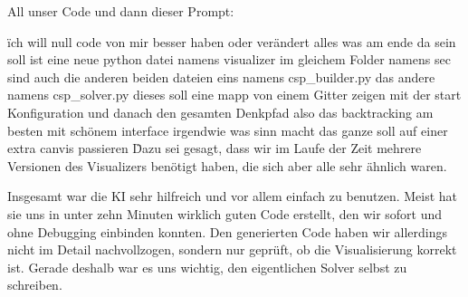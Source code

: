 \documentclass{article}
\begin{document}
All unser Code und dann dieser Prompt:

\"
ich will null code von mir besser haben oder verändert
alles was am ende da sein soll ist eine neue python datei namens visualizer
im gleichem Folder namens sec sind auch die anderen beiden dateien
eins namens csp\_builder.py das andere namens csp\_solver.py
dieses soll eine mapp von einem Gitter zeigen mit der start Konfiguration und danach den gesamten Denkpfad also das backtracking am besten mit schönem interface irgendwie was sinn macht
das ganze soll auf einer extra canvis passieren
\"

Dazu sei gesagt, dass wir im Laufe der Zeit mehrere Versionen des Visualizers benötigt haben, die sich aber alle sehr ähnlich waren.

Insgesamt war die KI sehr hilfreich und vor allem einfach zu benutzen. Meist hat sie uns in unter zehn Minuten 
wirklich guten Code erstellt, den wir sofort und ohne Debugging einbinden konnten. 
Den generierten Code haben wir allerdings nicht im Detail nachvollzogen, sondern nur 
geprüft, ob die Visualisierung korrekt ist. Gerade deshalb war es uns wichtig, den eigentlichen Solver selbst zu schreiben.
\end{document}
